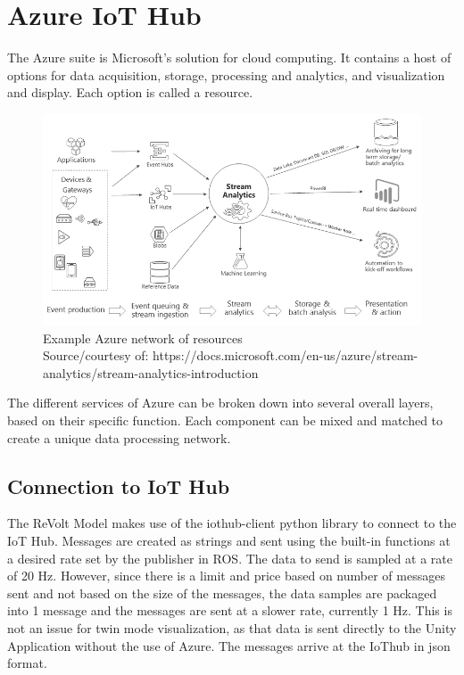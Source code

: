\chapter{Azure IoT Hub}

The Azure suite is Microsoft's solution for cloud computing. It contains a host of options for data acquisition, storage, processing and analytics, and visualization and display. Each option is called a resource.


\begin{figure}[H]
\centering
\includegraphics[scale=0.65]{Images/stream_analytics_intro_pipeline.png}
\caption{Example Azure network of resources \\ Source/courtesy of: https://docs.microsoft.com/en-us/azure/stream-analytics/stream-analytics-introduction}
\label{fig:exampleNetwork}
\end{figure}

The different services of Azure can be broken down into several overall layers, based on their specific function. Each component can be mixed and matched to create a unique data processing network.

\section{Connection to IoT Hub}
The ReVolt Model makes use of the iothub-client python library to connect to the IoT Hub. Messages are created as strings and sent using the built-in functions at a desired rate set by the publisher in ROS. The data to send is sampled at a rate of 20 Hz. However, since there is a limit and price based on number of messages sent and not based on the size of the messages, the data samples are packaged into 1 message and the messages are sent at a slower rate, currently 1 Hz. This is not an issue for twin mode visualization, as that data is sent directly to the Unity Application without the use of Azure. The messages arrive at the IoThub in json format.

